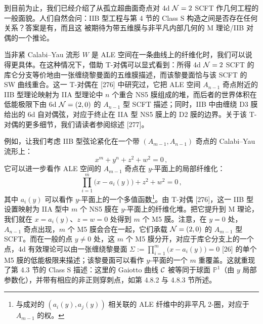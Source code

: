 
到目前为止，我们已经介绍了从孤立超曲面奇点对 4d $\mathcal{N}=2$ SCFT 作几何工程的一般面貌。人们自然会问：IIB 型工程与第 4 节的 Class S 构造之间是否存在任何关系？答案是有，而且这
被期待为带五维膜与非平凡内部几何的 M 理论/IIB 对偶的一个推论。

当非紧 Calabi--Yau 流形 $W$ 是 ALE 空间在一条曲线上的纤维化时，我们可以说得更具体。在这种情况下，借助 T-对偶可以显式看到：所得 4d $\mathcal{N}=2$ SCFT 的库仑分支等价地由一张缠绕黎曼面的五维膜描述，而该黎曼面恰与该 SCFT 的 SW 曲线重合。这一 T-对偶在 [276] 中研究过，它把 ALE 空间 $A_{n-1}$ 奇点附近的 IIB 型理论映射为 IIA 型理论中 $n$ 个重合 NS5 膜组成的堆，而后者的世界体积在低能极限下由 6d $\mathcal{N}=(2,0)$ 的 $A_{n-1}$ 型 SCFT 描述；同时，IIB 中由缠绕 D3 膜给出的 6d 自对偶弦，对应于终止在 IIA 型 NS5 膜上的 D2 膜的边界。关于该 T-对偶的更多细节，我们请读者参阅综述 [277]。


例如，让我们考虑 IIB 型弦论紧化在一个带 $(A_{m-1},A_{n-1})$ 奇点的 Calabi--Yau 流形上：
\begin{equation}
  x^m+y^n+z^2+w^2 = 0\,,
  \tag{5.26}
\end{equation}
它可以进一步看作 ALE 空间的 $A_{m-1}$ 奇点在 $y$-平面上的局部纤维化：
\begin{equation}
  \prod_{i=1}^{m}\bigl(x-a_i(y)\bigr)+z^2+w^2 = 0\,,
  \tag{5.27}
\end{equation}
其中 $a_i(y)$ 可以看作 $y$-平面上的一个多值函数\footnote{与成对的 $(a_i(y),a_j(y))$ 相关联的 ALE 纤维中的非平凡 2-圈，对应于 $A_{m-1}$ 的权。}。由 T-对偶 [276]，这一 IIB 型设置映射为 IIA 型中 $m$ 个 NS5 膜在 $y$-平面上的纤维化堆。把它提升到 M 理论，我们就在 $x=a_i(y)$、$z=w=0$ 处得到 $m$ 个 M5 膜。注意，在 $y=0$ 处，$A_{n-1}$ 奇点出现，$m$ 个 M5 膜会合在一起，它们承载 $\mathcal{N}=(2,0)$ 的 $A_{m-1}$ 型 SCFT。而在一般的点 $y\neq0$ 处，这 $m$ 个 M5 膜分开，对应于库仑分支上的一个点，4d 有效理论可以由一张缠绕黎曼面 $\Sigma:=\prod_{i=1}^{m}\bigl(x-a_i(y)\bigr)=0$ [26] 的单个 M5 膜的低能极限来描述；该黎曼面可以看作 $y$-平面的一个 $m$ 重覆盖。这就重现了第 4.3 节的 Class S 描述：这里的 Gaiotto 曲线 $\mathcal{C}$ 被等同于球面 $\mathbb{P}^1$（由 $y$ 局部参数化），并带有相应的非正则穿刺点，如第 4.8.2 与 4.8.3 节所述。

